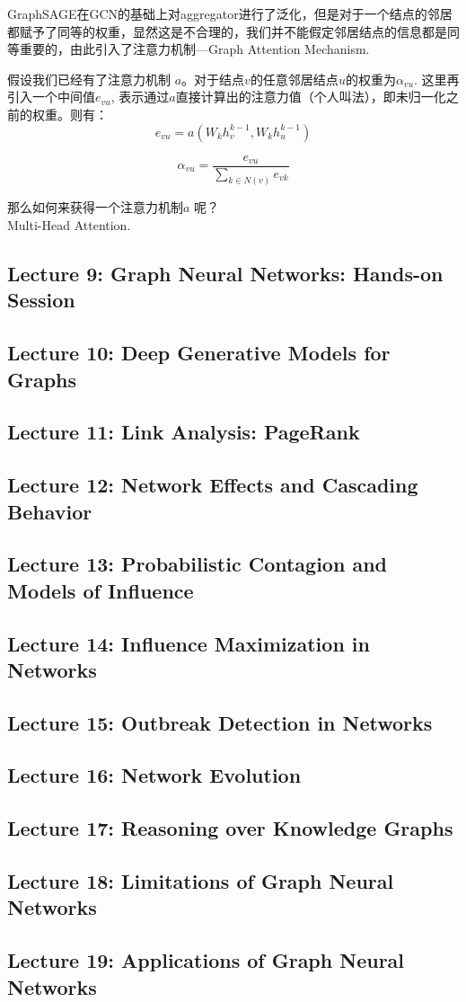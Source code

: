 GraphSAGE在GCN的基础上对aggregator进行了泛化，但是对于一个结点的邻居都赋予了同等的权重，显然这是不合理的，我们并不能假定邻居结点的信息都是同等重要的，由此引入了注意力机制---Graph Attention Mechanism.

假设我们已经有了注意力机制 $a$。对于结点$v$的任意邻居结点$u$的权重为$\alpha_{vu}$.
这里再引入一个中间值$e_{vu}$, 表示通过$a$直接计算出的注意力值（个人叫法），即未归一化之前的权重。则有：
$$
e_{vu} = a(W_kh_v^{k-1}, W_kh_u^{k-1})
$$

$$
\alpha_{vu} = \frac{e_{vu}}{\sum_{k \in N(v)} e_{vk}}
$$

那么如何来获得一个注意力机制$a$ 呢？  \\
Multi-Head Attention.

\subsection{Lecture 9: Graph Neural Networks:
Hands-on Session}

\subsection{Lecture 10: Deep Generative Models for Graphs}

\subsection{Lecture 11: Link Analysis: PageRank}

\subsection{Lecture 12: Network Effects and Cascading Behavior}

\subsection{Lecture 13: Probabilistic Contagion
and Models of Influence}

\subsection{Lecture 14: Influence Maximization in Networks}

\subsection{Lecture 15: Outbreak Detection in Networks}

\subsection{Lecture 16: Network Evolution}

\subsection{Lecture 17: Reasoning over Knowledge Graphs}

\subsection{Lecture 18: Limitations of Graph Neural Networks}

\subsection{Lecture 19: Applications of Graph Neural Networks}